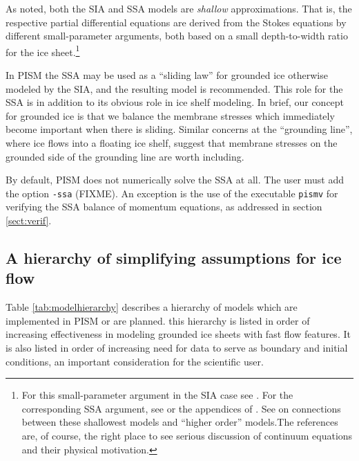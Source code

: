 \documentclass[11pt,final]{amsart}
\newcommand{\pismoptionindex}[1]{\index{options for PISM (and PETSc)!\texttt{-#1}}}
\newcommand{\intextoption}[1]{\texttt{-#1}\pismoptionindex{#1}}
\begin{document}
As noted, both the SIA and SSA models are \emph{shallow} approximations.  That is, the respective partial differential equations are derived from the Stokes equations by different small-parameter arguments, both based on a small depth-to-width ratio for the ice sheet.\footnote{For this small-parameter argument in the SIA case see \cite{Fowler}.  For the corresponding SSA argument, see \cite{WeisGreveHutter} or the appendices of \cite{SchoofStream}.  See \cite{SchoofHindmarsh} on connections between these shallowest models and ``higher order'' models.The references are, of course, the right place to see serious discussion of continuum equations and their physical motivation.}

In PISM the SSA may be used as a ``sliding law'' for grounded ice otherwise modeled by the SIA\cite{BBssasliding}, and the resulting model is recommended.  This role for the SSA is in addition to its obvious role in ice shelf modeling.  In brief, our concept for grounded ice is that we balance the membrane stresses which immediately become important when there is sliding.  Similar concerns at the ``grounding line'', where ice flows into a floating ice shelf, suggest that membrane stresses on the grounded side of the grounding line are worth including.

By default, PISM does not numerically solve the SSA at all.  The user must add the option \intextoption{ssa} (FIXME).  An exception is the use of the executable \verb|pismv| for verifying the SSA balance of momentum equations, as addressed in section \ref{sect:verif}.


\subsection{A hierarchy of simplifying assumptions for ice flow}   Table \ref{tab:modelhierarchy} describes a hierarchy of models which are implemented in PISM or are planned.  this hierarchy is listed in order of increasing effectiveness in modeling grounded ice sheets with fast flow features.  It is also listed in order of increasing need for data to serve as boundary and initial conditions, an important consideration for the scientific user.
\end{document}
